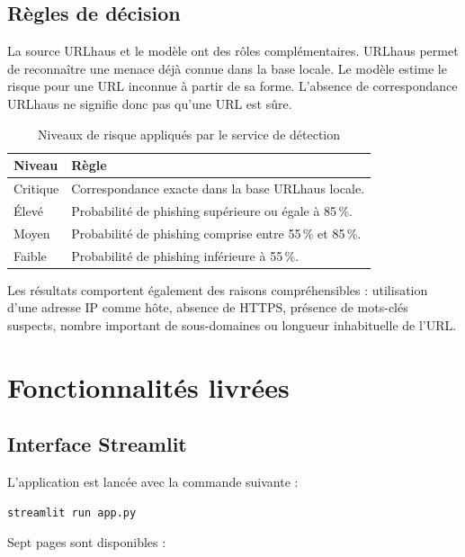 \documentclass[11pt,a4paper]{report}
\begin{document}
\section{Règles de décision}

La source URLhaus et le modèle ont des rôles complémentaires. URLhaus permet
de reconnaître une menace déjà connue dans la base locale. Le modèle estime le
risque pour une URL inconnue à partir de sa forme. L'absence de correspondance
URLhaus ne signifie donc pas qu'une URL est sûre.

\begin{table}[H]
\centering
\caption{Niveaux de risque appliqués par le service de détection}
\begin{tabular}{ll}
\toprule
\textbf{Niveau} & \textbf{Règle}\\
\midrule
Critique & Correspondance exacte dans la base URLhaus locale.\\
Élevé & Probabilité de phishing supérieure ou égale à 85\,\%.\\
Moyen & Probabilité de phishing comprise entre 55\,\% et 85\,\%.\\
Faible & Probabilité de phishing inférieure à 55\,\%.\\
\bottomrule
\end{tabular}
\end{table}

Les résultats comportent également des raisons compréhensibles : utilisation
d'une adresse IP comme hôte, absence de HTTPS, présence de mots-clés suspects,
nombre important de sous-domaines ou longueur inhabituelle de l'URL.

\chapter{Fonctionnalités livrées}

\section{Interface Streamlit}

L'application est lancée avec la commande suivante :

\begin{lstlisting}[language={},caption={Lancement du MVP}]
streamlit run app.py
\end{lstlisting}

Sept pages sont disponibles :
\end{document}
